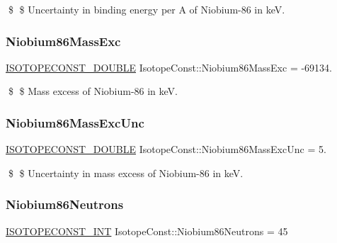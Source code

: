 \$ \$ Uncertainty in binding energy per A of Niobium-\/86 in keV. \mbox{\label{group___isotope_const-_niobium-_nb86_gafb9e04c7a1e8702d68d1bb606adb7761}} 
\subsubsection{\texorpdfstring{Niobium86\+Mass\+Exc}{Niobium86MassExc}}
{\footnotesize\ttfamily \mbox{\hyperlink{group___isotope_const-_macros_ga8f45a7272ce02c0b4c65c44636ed719a}{I\+S\+O\+T\+O\+P\+E\+C\+O\+N\+S\+T\+\_\+\+D\+O\+U\+B\+LE}} Isotope\+Const\+::\+Niobium86\+Mass\+Exc = -\/69134.}

\$ \$ Mass excess of Niobium-\/86 in keV. \mbox{\label{group___isotope_const-_niobium-_nb86_ga243fc780f6fa700d9e125f5a48f5be81}} 
\subsubsection{\texorpdfstring{Niobium86\+Mass\+Exc\+Unc}{Niobium86MassExcUnc}}
{\footnotesize\ttfamily \mbox{\hyperlink{group___isotope_const-_macros_ga8f45a7272ce02c0b4c65c44636ed719a}{I\+S\+O\+T\+O\+P\+E\+C\+O\+N\+S\+T\+\_\+\+D\+O\+U\+B\+LE}} Isotope\+Const\+::\+Niobium86\+Mass\+Exc\+Unc = 5.}

\$ \$ Uncertainty in mass excess of Niobium-\/86 in keV. \mbox{\label{group___isotope_const-_niobium-_nb86_gaa5d386f186b53d522eb2ea9e2fbfc0d7}} 
\subsubsection{\texorpdfstring{Niobium86\+Neutrons}{Niobium86Neutrons}}
{\footnotesize\ttfamily \mbox{\hyperlink{group___isotope_const-_macros_ga5f18360b3e99483a35c32d789e62621c}{I\+S\+O\+T\+O\+P\+E\+C\+O\+N\+S\+T\+\_\+\+I\+NT}} Isotope\+Const\+::\+Niobium86\+Neutrons = 45}

